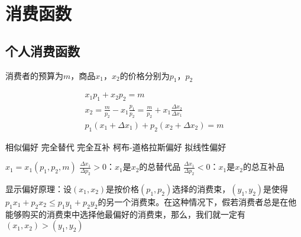 \documentclass[12pt]{book}
\begin{document}
\section{消费函数}


\subsection{个人消费函数}





消费者的预算为$m$，商品$x_1$，$x_2$的价格分别为$p_1$，$p_2$

\begin{gather*}
    x_{1}p_{1} + x_{2}p_{2} = m \\
    x_{2} 
    = \frac{m}{p_{2}} - x_{1}\frac{p_{1}}{p_{2}} 
    =  \frac{m}{p_{2}} + x_{1}\frac{\Delta x_{2}}{\Delta x_{1}} \\
    p_{1}({x_{1}}+\Delta x_{1}) + p_{2}(x_{2}+\Delta x_{2}) = m  
\end{gather*}




相似偏好
    完全替代
    完全互补
    柯布-道格拉斯偏好
拟线性偏好


$x_{1} = x_{1}(p_{1},p_{2},m) $
$\frac{\Delta x_{1}}{\Delta p_{2}}>0$：$x_{1}$是$x_{2}$的总替代品
$\frac{\Delta x_{1}}{\Delta p_{2}}<0$：$x_{1}$是$x_{2}$的总互补品


显示偏好原理：设$(x_1,x_2)$是按价格$(p_1,p_2)$选择的消费束，$(y_1,y_2)$是使得$p_{1}x_{1}+p_{2}x_{2}\leqslant p_{1}y_{1}+p_{2}y_{2}$的另一个消费束。在这种情况下，假若消费者总是在他能够购买的消费束中选择他最偏好的消费束，那么，我们就一定有$(x_1,x_2)>(y_1,y_2)$
\end{document}
